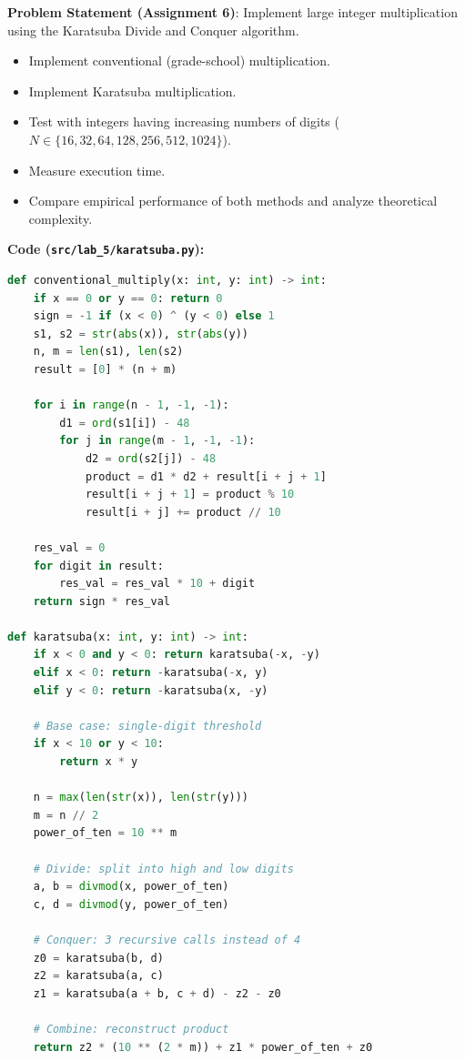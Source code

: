 \documentclass[12pt]{article}
\begin{document}
\textbf{Problem Statement (Assignment 6)}:
Implement large integer multiplication using the Karatsuba Divide and Conquer algorithm.
\begin{itemize}
    \item Implement conventional (grade-school) multiplication.
    \item Implement Karatsuba multiplication.
    \item Test with integers having increasing numbers of digits ($N \in \{16, 32, 64, 128, 256, 512, 1024\}$).
    \item Measure execution time.
    \item Compare empirical performance of both methods and analyze theoretical complexity.
\end{itemize}

\vspace{0.2cm}
\textbf{Code (\texttt{src/lab\_5/karatsuba.py}):}

\begin{lstlisting}[language=Python]
def conventional_multiply(x: int, y: int) -> int:
    if x == 0 or y == 0: return 0
    sign = -1 if (x < 0) ^ (y < 0) else 1
    s1, s2 = str(abs(x)), str(abs(y))
    n, m = len(s1), len(s2)
    result = [0] * (n + m)

    for i in range(n - 1, -1, -1):
        d1 = ord(s1[i]) - 48
        for j in range(m - 1, -1, -1):
            d2 = ord(s2[j]) - 48
            product = d1 * d2 + result[i + j + 1]
            result[i + j + 1] = product % 10
            result[i + j] += product // 10

    res_val = 0
    for digit in result:
        res_val = res_val * 10 + digit
    return sign * res_val

def karatsuba(x: int, y: int) -> int:
    if x < 0 and y < 0: return karatsuba(-x, -y)
    elif x < 0: return -karatsuba(-x, y)
    elif y < 0: return -karatsuba(x, -y)

    # Base case: single-digit threshold
    if x < 10 or y < 10:
        return x * y

    n = max(len(str(x)), len(str(y)))
    m = n // 2
    power_of_ten = 10 ** m

    # Divide: split into high and low digits
    a, b = divmod(x, power_of_ten)
    c, d = divmod(y, power_of_ten)

    # Conquer: 3 recursive calls instead of 4
    z0 = karatsuba(b, d)
    z2 = karatsuba(a, c)
    z1 = karatsuba(a + b, c + d) - z2 - z0

    # Combine: reconstruct product
    return z2 * (10 ** (2 * m)) + z1 * power_of_ten + z0
\end{lstlisting}
\end{document}
